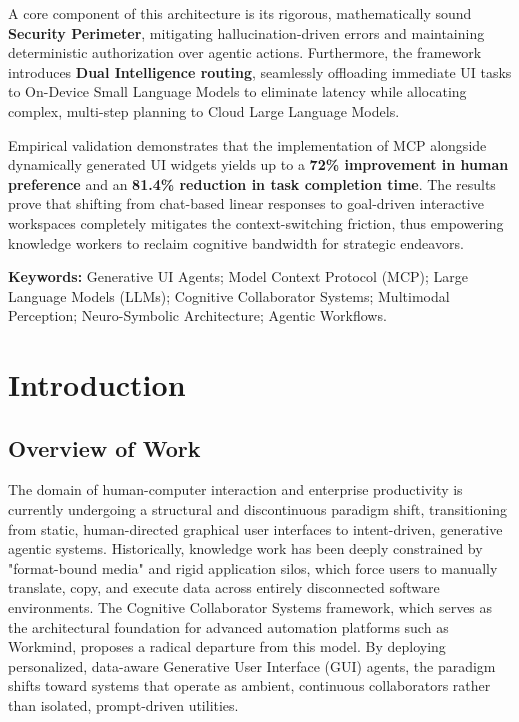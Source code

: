 \documentclass[12pt, a4paper]{report}
\begin{document}
A core component of this architecture is its rigorous, mathematically sound \textbf{Security Perimeter}, mitigating hallucination-driven errors and maintaining deterministic authorization over agentic actions. Furthermore, the framework introduces \textbf{Dual Intelligence routing}, seamlessly offloading immediate UI tasks to On-Device Small Language Models to eliminate latency while allocating complex, multi-step planning to Cloud Large Language Models. 

Empirical validation demonstrates that the implementation of MCP alongside dynamically generated UI widgets yields up to a \textbf{72\% improvement in human preference} and an \textbf{81.4\% reduction in task completion time}. The results prove that shifting from chat-based linear responses to goal-driven interactive workspaces completely mitigates the context-switching friction, thus empowering knowledge workers to reclaim cognitive bandwidth for strategic endeavors.

\vspace{1em}
\textbf{Keywords:} Generative UI Agents; Model Context Protocol (MCP); Large Language Models (LLMs); Cognitive Collaborator Systems; Multimodal Perception; Neuro-Symbolic Architecture; Agentic Workflows.


\newpage
\tableofcontents
\newpage
\listoffigures
\listoftables



\newpage
{}

\chapter{Introduction}
\section{Overview of Work}
The domain of human-computer interaction and enterprise productivity is currently undergoing a structural and discontinuous paradigm shift, transitioning from static, human-directed graphical user interfaces to intent-driven, generative agentic systems.\cite{hojo2025} Historically, knowledge work has been deeply constrained by "format-bound media" and rigid application silos, which force users to manually translate, copy, and execute data across entirely disconnected software environments.\cite{microsoft2026} The Cognitive Collaborator Systems framework, which serves as the architectural foundation for advanced automation platforms such as Workmind, proposes a radical departure from this model. By deploying personalized, data-aware Generative User Interface (GUI) agents, the paradigm shifts toward systems that operate as ambient, continuous collaborators rather than isolated, prompt-driven utilities.\cite{hojo2025}
\end{document}
